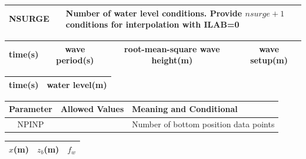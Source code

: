 \documentclass[11pt,oneside]{book}
\begin{document}
\begin{table}[h]
\begin{center}
\begin{tabular}{||c|c|p{8cm}||}
NSURGE &  & Number of water level conditions. Provide $nsurge+1$ conditions for interpolation with ILAB=0\\ \hline
\end{tabular}
\end{center}
\begin{center}
\begin{tabular}{||c|c|c|c||}\hline
time(s) & wave period(s) & root-mean-square wave height(m)& wave setup(m)\\ \hline
\end{tabular}
\end{center}
\begin{center}
\begin{tabular}{||c|c||}\hline
time(s) & water level(m)\\ \hline
\end{tabular}
\end{center}
\begin{center}
\begin{tabular}{||c|c|p{8cm}||}\hline
Parameter& Allowed Values   & Meaning and Conditional  \\ \hline \hline
NPINP &  & Number of bottom position data points  \\ \hline
\end{tabular}
\end{center}
\begin{center}
\begin{tabular}{||c|c|c||}\hline
$x$(m) & $z_b$(m) & $f_w$\\ \hline
\end{tabular}
\end{center}
\end{table}

\clearpage
\end{document}
